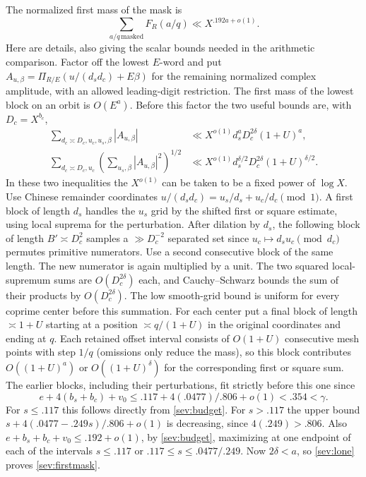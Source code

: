 \documentclass[11pt,a4paper]{article}
\theoremstyle{paperplain}
\numberwithin{equation}{section}
\begin{document}
The normalized first mass of the mask is
\begin{equation}
 \sum_{a/q\,\mathrm{masked}}F_R(a/q)
        \ll X^{.192a+o(1)} .
 \label{sev:firstmask}
\end{equation}
Here are details, also giving the scalar bounds needed in the arithmetic
comparison. Factor off the lowest $E$-word and put
$A_{u,\beta}=\Pi_{R/E}(u/(d_s d_c)+E\beta)$ for the remaining
normalized complex amplitude, with an allowed leading-digit
restriction. The first mass of the lowest block on an orbit is
$O(E^a)$. Before this factor the two useful bounds are, with $D_c=X^{b_c}$,
\begin{align}
 \sum_{d_c\asymp D_c,u_c,u_s,\beta}|A_{u,\beta}|
    &\ll X^{o(1)} d_s^a D_c^{2\delta}(1+U)^a,\label{sev:lone}\\
 \sum_{d_c\asymp D_c,u_c}
        \left(\sum_{u_s,\beta}|A_{u,\beta}|^2\right)^{1/2}
    &\ll X^{o(1)} d_s^{\delta/2}D_c^{2\delta}(1+U)^{\delta/2}.
 \label{sev:ltwo}
\end{align}
In these two inequalities the $X^{o(1)}$ can be taken to be a fixed
power of $\log X$. Use Chinese remainder coordinates
$u/(d_s d_c)=u_s/d_s+u_c/d_c\pmod1$. A first block of length
$d_s$ handles the $u_s$ grid by the shifted first or square estimate,
using local suprema for the perturbation. After dilation by $d_s$,
the following block of length $B'\asymp D_c^2$ samples a
$\gg D_c^{-2}$ separated set since
$u_c\mapsto d_su_c\pmod {d_c}$ permutes primitive numerators.
Use a second consecutive block of the same length. The new numerator
is again multiplied by a unit. The two squared local-supremum sums
are $O(D_c^{2\delta})$ each, and Cauchy--Schwarz bounds the sum of
their products by $O(D_c^{2\delta})$. The low smooth-grid bound is
uniform for every coprime center before this summation.
For each center put a final block of length $\asymp1+U$ starting at
a position $\asymp q/(1+U)$ in the original coordinates and ending
at $q$. Each retained offset interval consists of $O(1+U)$ consecutive
mesh points with step $1/q$ (omissions only reduce the mass), so this
block contributes $O((1+U)^a)$ or $O((1+U)^\delta)$ for the
corresponding first or square sum. The earlier blocks, including
their perturbations, fit strictly before this one since
\[
 e+4(b_s+b_c)+v_0
    \le .117+4(.0477)/.806+o(1)<.354<\gamma.
\]
For $s\le.117$ this follows directly from \eqref{sev:budget}.
For $s>.117$ the upper bound $s+4(.0477-.249s)/.806+o(1)$
is decreasing, since $4(.249)>.806$.
Also $e+b_s+b_c+v_0\le .192+o(1)$, by
\eqref{sev:budget}, maximizing at one endpoint of each of the
intervals $s\le.117$ or $.117\le s\le .0477/.249$.
Now $2\delta<a$, so \eqref{sev:lone} proves \eqref{sev:firstmask}.
\end{document}
